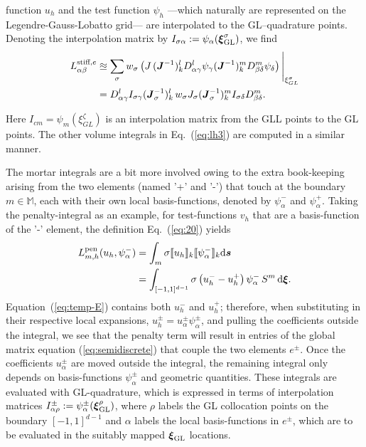 function $u_h$ and the test function $\psi_h$ ---which naturally are represented 
on the Legendre-Gauss-Lobatto grid--- are interpolated to
the GL--quadrature points. Denoting the interpolation matrix by $I_{\sigma\alpha}:=\psi_\alpha(\boldsymbol{\xi}^\sigma_{\rm GL})$, we find
\begin{align}
L^{\text{stiff},e}_{\alpha\beta}
      &\approxeq \sum_\sigma w_\sigma
    \left(J\,
    (\boldsymbol{J}^{-1})^l_kD^l_{\alpha\gamma}\psi_{\gamma}
    (\boldsymbol{J}^{-1})^m_kD^m_{\beta\delta}\psi_{\delta}
    \right)\Bigg|_{\xi^\sigma_{GL}} \\
    &=   D^l_{\alpha\gamma}I_{\sigma\gamma}(\boldsymbol{J}_\sigma^{-1})^l_k\, w_\sigma J_\sigma (\boldsymbol{J}_\sigma^{-1})^m_k I_{\sigma\delta} D^m_{\beta\delta}  \label{eq:harald-stiff}.
\end{align}


%
Here $I_{cm} = \psi_m(\xi^\zeta_{GL})$ is an interpolation matrix from
the GLL points to the GL points.
%
%
The other volume integrals in Eq.~(\ref{eq:lh3})
are computed in a similar manner.

%
  The mortar integrals are a bit more
  involved owing to the extra book-keeping arising from the two elements (named '+' and '-') that touch at the boundary $m\in\mathbb{M}$, each with their own local basis-functions,
  denoted by $\psi^-_\alpha$ and $\psi^+_\alpha$.  Taking the penalty-integral as an example, for test-functions $v_h$ that are a basis-function of the '-' element, the definition Eq.~(\ref{eq:20}) yields
\begin{align}
  L^{\text{pen}}_{m,h}(u_h, \psi^-_\alpha) 
  &= \int
  _{m}\sigma \llbracket u_h \rrbracket_k \llbracket \psi^-_\alpha \rrbracket_k \mathrm{d}\boldsymbol{s} \\
\label{eq:temp-E}
  &= \int
  _{[-1,1]^{d-1}}\sigma \left(u_h^{-} - u_h^{+}\right)\psi^-_\alpha\,S^m\,\mathrm{d}\boldsymbol{\xi}.
\end{align}
Equation~(\ref{eq:temp-E}) contains both $u_h^-$ and $u_h^+$;
therefore, when substituting in their respective local expansions,
$u_h^{\pm}=u_\alpha^\pm \psi_\alpha^\pm$, and pulling the coefficients
outside the integral, we see that the penalty term will result in
entries of the global matrix equation (\ref{eq:semidiscrete}) that
couple the two elements $e^\pm$.  Once the coefficients $u_\alpha^\pm$
are moved outside the integral, the remaining integral only depends on
basis-functions $\psi_\alpha^\pm$ and geometric quantities.  These integrals are
evaluated with GL-quadrature, which is expressed in terms of interpolation matrices $I_{\alpha\rho}^\pm :=\psi^\pm_\alpha(\boldsymbol{\xi}^\rho_{\rm GL})$, where  $\rho$ labels the GL collocation points on the boundary $[-1,1]^{d-1}$ and $\alpha$ labels the local basis-functions in $e^\pm$, which are to be evaluated in the suitably mapped $\boldsymbol{\xi}_{\rm GL}$ locations.
% 
%
%

